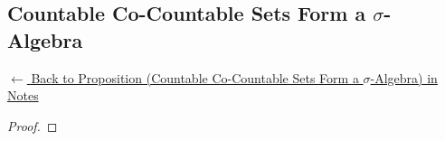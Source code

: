 
\subsection*{Countable Co-Countable Sets Form a $\sigma$-Algebra}
\label{prf:countable-cocountable-sigma}

\begin{remark*}[Return]
\hyperref[prop:countable-cocountable-sigma]{$\leftarrow$ Back to Proposition (Countable Co-Countable Sets Form a $\sigma$-Algebra) in Notes}
\end{remark*}

\begin{proof}
\end{proof}

\begin{remark*}

\end{remark*}

\begin{remark*}[Dependencies]

\FlashUses{}
\end{remark*}

